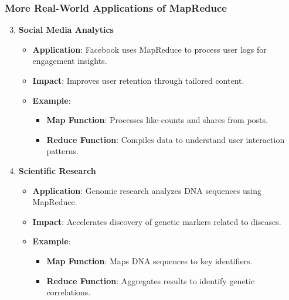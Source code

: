 \documentclass[aspectratio=169]{beamer}
\begin{document}
\begin{frame}[fragile]
    \frametitle{More Real-World Applications of MapReduce}
    \begin{enumerate}
        \setcounter{enumi}{2}
        \item \textbf{Social Media Analytics}
            \begin{itemize}
                \item \textbf{Application}: Facebook uses MapReduce to process user logs for engagement insights.
                \item \textbf{Impact}: Improves user retention through tailored content.
                \item \textbf{Example}:
                    \begin{itemize}
                        \item \textbf{Map Function}: Processes like-counts and shares from posts.
                        \item \textbf{Reduce Function}: Compiles data to understand user interaction patterns.
                    \end{itemize}
            \end{itemize}
        \item \textbf{Scientific Research}
            \begin{itemize}
                \item \textbf{Application}: Genomic research analyzes DNA sequences using MapReduce.
                \item \textbf{Impact}: Accelerates discovery of genetic markers related to diseases.
                \item \textbf{Example}:
                    \begin{itemize}
                        \item \textbf{Map Function}: Maps DNA sequences to key identifiers.
                        \item \textbf{Reduce Function}: Aggregates results to identify genetic correlations.
                    \end{itemize}
            \end{itemize}
    \end{enumerate}
\end{frame}
\end{document}
